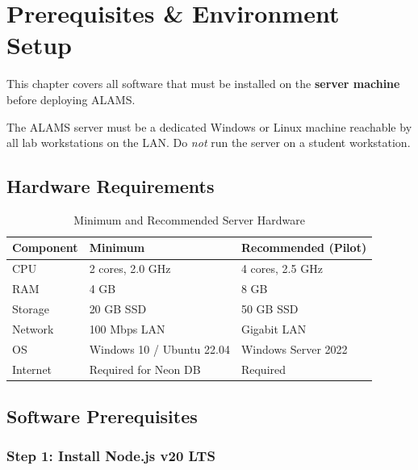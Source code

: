 \chapter{Prerequisites \& Environment Setup}
\label{ch:prerequisites}

This chapter covers all software that must be installed on the \textbf{server machine} before deploying ALAMS.

\begin{tcolorbox}[warningbox, title={\faExclamationTriangle\quad Server Machine Requirements}]
The ALAMS server must be a dedicated Windows or Linux machine reachable by all lab workstations on the LAN. Do \emph{not} run the server on a student workstation.
\end{tcolorbox}

\section{Hardware Requirements}

\begin{table}[h!]
\centering
\caption{Minimum and Recommended Server Hardware}
\label{tab:hardware}
\begin{tabularx}{\textwidth}{lXX}
\toprule
\textbf{Component} & \textbf{Minimum} & \textbf{Recommended (Pilot)}\\
\midrule
\rowcolor{aurxonlightgray}
CPU & 2 cores, 2.0 GHz & 4 cores, 2.5 GHz\\
RAM & 4 GB & 8 GB\\
\rowcolor{aurxonlightgray}
Storage & 20 GB SSD & 50 GB SSD\\
Network & 100 Mbps LAN & Gigabit LAN\\
\rowcolor{aurxonlightgray}
OS & Windows 10 / Ubuntu 22.04 & Windows Server 2022\\
Internet & Required for Neon DB & Required\\
\bottomrule
\end{tabularx}
\end{table}

\section{Software Prerequisites}

\subsection{Step 1: Install Node.js v20 LTS}

